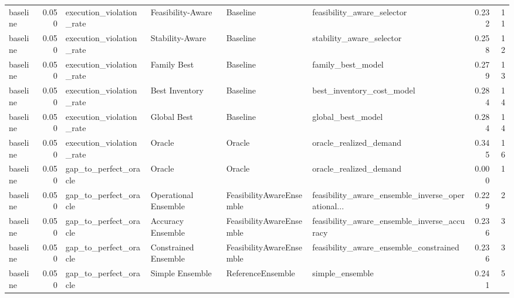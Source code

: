 \begin{table}
{\begin{tabular}{lrllllrr}
      baseline &             0.050 &    execution\_violation\_rate &     Feasibility-Aware &                  Baseline &                         feasibility\_aware\_selector &         0.232 &              11 \\
      baseline &             0.050 &    execution\_violation\_rate &       Stability-Aware &                  Baseline &                           stability\_aware\_selector &         0.258 &              12 \\
      baseline &             0.050 &    execution\_violation\_rate &           Family Best &                  Baseline &                                  family\_best\_model &         0.279 &              13 \\
      baseline &             0.050 &    execution\_violation\_rate &        Best Inventory &                  Baseline &                          best\_inventory\_cost\_model &         0.284 &              14 \\
      baseline &             0.050 &    execution\_violation\_rate &           Global Best &                  Baseline &                                  global\_best\_model &         0.284 &              14 \\
      baseline &             0.050 &    execution\_violation\_rate &                Oracle &                    Oracle &                             oracle\_realized\_demand &         0.345 &              16 \\
      baseline &             0.050 &       gap\_to\_perfect\_oracle &                Oracle &                    Oracle &                             oracle\_realized\_demand &         0.000 &               1 \\
      baseline &             0.050 &       gap\_to\_perfect\_oracle &  Operational Ensemble &  FeasibilityAwareEnsemble &  feasibility\_aware\_ensemble\_inverse\_operational... &         0.229 &               2 \\
      baseline &             0.050 &       gap\_to\_perfect\_oracle &     Accuracy Ensemble &  FeasibilityAwareEnsemble &        feasibility\_aware\_ensemble\_inverse\_accuracy &         0.236 &               3 \\
      baseline &             0.050 &       gap\_to\_perfect\_oracle &  Constrained Ensemble &  FeasibilityAwareEnsemble &             feasibility\_aware\_ensemble\_constrained &         0.236 &               3 \\
      baseline &             0.050 &       gap\_to\_perfect\_oracle &       Simple Ensemble &         ReferenceEnsemble &                                    simple\_ensemble &         0.241 &               5 \\

\end{tabular}}
\end{table}
